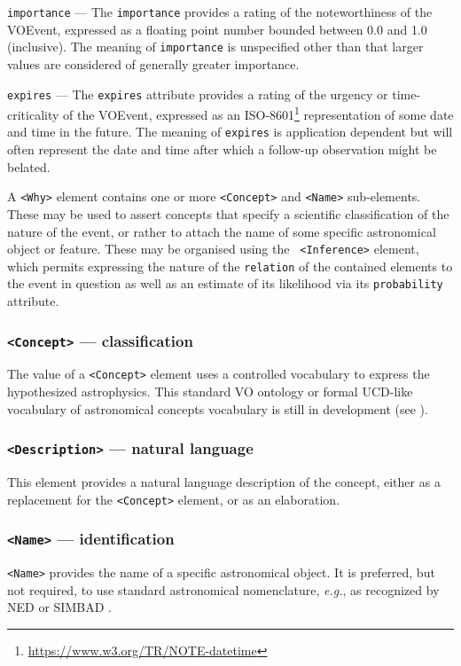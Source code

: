 \documentclass[11pt,a4paper]{ivoa}
\begin{document}
 {\tt importance}\label{sec:3.6.1} ---
The {\tt importance} provides a rating of the noteworthiness of the VOEvent,
expressed as a floating point number bounded between 0.0 and 1.0 (inclusive).
The meaning of {\tt importance} is unspecified other than that larger values are
considered of generally greater importance.

 {\tt expires}\label{sec:3.6.2} ---
The {\tt expires} attribute provides a rating of the urgency or time-criticality
of the VOEvent, expressed as an ISO-8601\footnote{\url{
https://www.w3.org/TR/NOTE-datetime}} representation of some date and time in
the future. The meaning of {\tt expires} is application dependent but will often
represent the date and time after which a follow-up observation might be
belated.

A {\tt <Why>} element contains one or more {\tt <Concept>} and {\tt <Name>}
sub-elements. These may be used to assert concepts that specify a scientific
classification of the nature of the event, or rather to attach the name of some
specific astronomical object or feature. These may be organised using the {\tt
<Inference>} element, which permits expressing the nature of the {\tt relation}
of the contained elements to the event in question as well as an estimate of its
likelihood via its {\tt probability} attribute.

\setcounter{subsubsection}{2}
\subsubsection{{\tt <Concept>} --- classification}\label{sec:3.6.3}
The value of a {\tt <Concept>} element uses a controlled vocabulary to express
the hypothesized astrophysics. This standard VO ontology or formal UCD-like
vocabulary of astronomical concepts vocabulary is still in development (see
\citet{2018ivoa.spec.0527P}).

\subsubsection{{\tt <Description>} --- natural language}\label{sec:3.6.4}
This element provides a natural language description of the concept, either as
a replacement for the {\tt <Concept>} element, or as an elaboration.

\subsubsection{{\tt <Name>} --- identification}\label{sec:3.6.5}
{\tt <Name>} provides the name of a specific astronomical object. It is
preferred, but not required, to use standard astronomical nomenclature,
\emph{e.g.}, as recognized by NED \citep{bib22} or SIMBAD \citep{bib23}.
\end{document}
